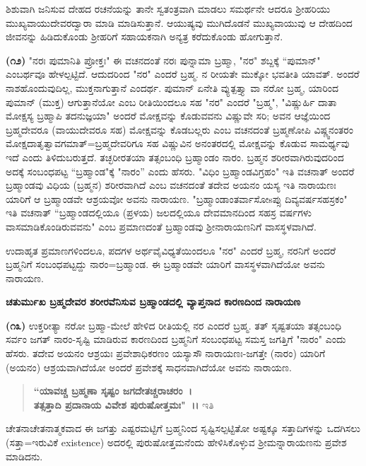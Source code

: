 
\noindent
ಶಿಶುವಾಗಿ ಜನಿಸುವ ದೇಹದ ರಚನೆಯನ್ನು ತಾನೇ ಸ್ವತಂತ್ರವಾಗಿ ಮಾಡಲು ಸಮರ್ಥನೇ ಆದರೂ ಶ‍್ರೀಹರಿಯು ಮುಖ್ಯವಾಯುದೇವರದ್ವಾರಾ ಮಾಡಿ ಮಾಡಿಸುತ್ತಾನೆ. ಆಯುಷ್ಯವು ಮುಗಿದೊಡನೆ ಮುಖ್ಯವಾಯುವು ಆ ದೇಹದಿಂದ ಜೀವನನ್ನು ಹಿಡಿದುಕೊಂಡು ಶ‍್ರೀಹರಿಗೆ ಸಹಾಯಕನಾಗಿ ಅನ್ಯತ್ರ ಕರೆದುಕೊಂಡು ಹೋಗುತ್ತಾನೆ.

\textbf{(೧೨)} "ನರಃ ಪುಮಾನಿತಿ ಪ್ರೋಕ್ತಃ" ಈ ವಚನದಂತೆ ನರಃ ಪುನ್ನಾಮಾ ಬ್ರಹ್ಮಾ, "ನರ" ಶಬ್ದಕ್ಕೆ “ಪುಮಾನ್" ಎಂಬರ್ಥವೂ ಹೇಳಲ್ಪಟ್ಟಿದೆ. ಆದುದರಿಂದ "ನರ" ಎಂದರೆ ಬ್ರಹ್ಮ. ನ ರೀಯತೇ ಮುಕ್ಕೋ ಭವತೀತಿ ಯಾವತ್. ಅಂದರೆ ನಾಶಹೊಂದುವುದಿಲ್ಲ, ಮುಕ್ತನಾಗುತ್ತಾನೆ ಎಂದರ್ಥ. ಪುಮಾನ್ ಏನೇತಿ ವ್ಯುತ್ಪತ್ತ್ಯಾ ವಾ ನರೋ ಬ್ರಹ್ಮ, ಯಾರಿಂದ ಪುಮಾನ್ (ಮುಕ್ತ) ಆಗುತ್ತಾನೆಯೋ ಎಂಬ ರೀತಿಯಿಂದಲೂ ಸಹ "ನರ" ಎಂದರೆ "ಬ್ರಹ್ಮ", "ವಿಷ್ಣುರ್ಹಿ ದಾತಾ ಮೋಕ್ಷಸ್ಯ ಬ್ರಹ್ಮಾಪಿ ತದನುಜ್ಞಯಾ" ಅಂದರೆ ಮೋಕ್ಷವನ್ನು ಕೊಡುವವನು ವಿಷ್ಣುವೇ ಸರಿ; ಅವನ ಆಜ್ಞೆಯಿಂದ ಬ್ರಹ್ಮದೇವರೂ (ವಾಯುದೇವರೂ ಸಹ) ಮೋಕ್ಷವನ್ನು ಕೊಡಬಲ್ಲರು ಎಂಬ ವಚನದಂತೆ ಬ್ರಹ್ಮಣೋಪಿ ವಿಷ್ಣ್ವನಂತರಂ ಮೋಕ್ಷದಾತೃತ್ವಾವಗಮಾತ್=ಬ್ರಹ್ಮದೇವರಿಗೂ ಸಹ ವಿಷ್ಣುವಿನ ಅನಂತರದಲ್ಲಿ ಮೋಕ್ಷವನ್ನು ಕೊಡುವ ಸಾಮರ್ಥ್ಯವು ಇದೆ ಎಂದು ತಿಳಿದುಬರುತ್ತದೆ. ತಚ್ಛರೀರತಯಾ ತತ್ಸಂಬಂಧಿ ಬ್ರಹ್ಮಾಂಡಂ ನಾರಂ. ಬ್ರಹ್ಮನ ಶರೀರವಾಗಿರುವುದರಿಂದ ಅದಕ್ಕೆ ಸಂಬಂಧಪಟ್ಟ “ಬ್ರಹ್ಮಾಂಡ"ಕ್ಕೆ "ನಾರಂ'' ಎಂದು ಹೆಸರು. "ವಿಧಿಂ ಬ್ರಹ್ಮಾಂಡವಿಗ್ರಹಂ" ಇತಿ ವಚನಾತ್ ಅಂದರೆ ಬ್ರಹ್ಮಾಂಡವು ವಿಧಿಯ (ಬ್ರಹ್ಮನ) ಶರೀರವಾಗಿದೆ ಎಂಬ ವಚನದಂತೆ ತದೇವ ಅಯನಂ ಯಸ್ಯ ಇತಿ ನಾರಾಯಣಃ ಯಾರಿಗೆ ಆ ಬ್ರಹ್ಮಾಂಡವೇ ಆಶ್ರಯವೋ ಅವನು ನಾರಾಯಣ. "ಬ್ರಹ್ಮಾಂಡಾಂತ\-ರ್ವಾಸೋsಪ್ಸು ದಿವ್ಯವರ್ಷಸಹಸ್ರಕಂ" ಇತಿ ವಚನಾತ್ “ಬ್ರಹ್ಮಾಂಡದಲ್ಲಿಯೂ (ಪ್ರಳಯ) ಜಲದಲ್ಲಿಯೂ ದೇವಮಾನದಿಂದ ಸಹಸ್ರ ವರ್ಷಗಳು ವಾಸಮಾಡಿಕೊಂಡಿರುವವನು" ಎಂಬ ಪ್ರಮಾಣದಂತೆ ಬ್ರಹ್ಮಾಂಡವು ಶ‍್ರೀನಾರಾಯಣನಿಗೆ ವಾಸಸ್ಥಳವಾಗಿದೆ.

ಉದಾಹೃತ ಪ್ರಮಾಣಗಳಿಂದಲೂ, ಪದಗಳ ಅರ್ಥವೈವಿಧ್ಯತೆಯಿಂದಲೂ "ನರ" ಎಂದರೆ ಬ್ರಹ್ಮ, ನರನಿಗೆ ಅಂದರೆ ಬ್ರಹ್ಮನಿಗೆ ಸಂಬಂಧಪಟ್ಟದ್ದು ನಾರಂ=ಬ್ರಹ್ಮಾಂಡ. ಈ ಬ್ರಹ್ಮಾಂಡವೇ ಯಾರಿಗೆ ವಾಸಸ್ಥಳವಾಗಿದೆಯೋ ಅವನು ನಾರಾಯಣ.

\begin{center}
\textbf{ಚತುರ್ಮುಖ ಬ್ರಹ್ಮದೇವರ ಶರೀರವೆನಿಸುವ ಬ್ರಹ್ಮಾಂಡದಲ್ಲಿ ವ್ಯಾಪ್ತನಾದ ಕಾರಣದಿಂದ ನಾರಾಯಣ}
\end{center}

\textbf{(೧೩)} ಉಕ್ತರೀತ್ಯಾ ನರೋ ಬ್ರಹ್ಮಾ-ಮೇಲೆ ಹೇಳಿದ ರೀತಿಯಲ್ಲಿ ನರ ಎಂದರೆ ಬ್ರಹ್ಮ. ತತ್ ಸೃಷ್ಟತಯಾ ತತ್ಸಂಬಂಧಿ ಸರ್ವಂ ಜಗತ್ ನಾರಂ-ಸೃಷ್ಟಿ ಮಾಡಿರುವ ಕಾರಣದಿಂದ ಬ್ರಹ್ಮನಿಗೆ ಸಂಬಂಧಪಟ್ಟ ಸಮಸ್ತ ಜಗತ್ತಿಗೆ "ನಾರಂ" ಎಂದು ಹೆಸರು. ತದೇವ ಅಯನಂ ಆಶ್ರಯಃ ಪ್ರವೇಶಾಧಿಕರಣಂ ಯಸ್ಯಾಸೌ ನಾರಾಯಣಃ-ಜಗತ್ತೇ (ನಾರಂ) ಯಾರಿಗೆ (ಅಯನಂ) ಆಶ್ರಯವಾಗಿದೆಯೋ ಅಂದರೆ ಪ್ರವೇಶಕ್ಕೆ ಸಾಧನವಾಗಿದೆಯೋ ಅವನು ನಾರಾಯಣ.

\begin{verse}
 \textbf{“ಯಾವಚ್ಚ ಬ್ರಹ್ಮಣಾ ಸೃಷ್ಟಂ ಜಗದೇತಚ್ಚರಾಚರಂ~।}\\\textbf{ತತ್ಸತ್ತಾದಿ ಪ್ರದಾನಾಯ ವಿವೇಶ ಪುರುಷೋತ್ತಮಃ"~।।} ಇತಿ 
\end{verse}

\noindent
ಚೇತನಾಚೇತನಾತ್ಮಕವಾದ ಈ ಜಗತ್ತು ಎಷ್ಟರಮಟ್ಟಿಗೆ ಬ್ರಹ್ಮನಿಂದ ಸೃಷ್ಟಿಸಲ್ಪಟ್ಟಿತೋ ಅಷ್ಟಕ್ಕೂ ಸತ್ತಾದಿಗಳನ್ನು ಒದಗಿಸಲು (ಸತ್ತಾ=ಇರುವಿಕೆ existence) ಅದರಲ್ಲಿ ಪುರುಷೋತ್ತಮನೆಂದು ಹೇಳಿಸಿಕೊಳ್ಳುವ ಶ‍್ರೀಮನ್ನಾರಾಯಣನು ಪ್ರವೇಶ ಮಾಡಿದನು.

